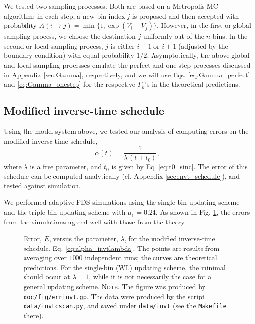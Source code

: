 \documentclass[reprint, superscriptaddress, floatfix]{revtex4-1}
\newcommand{\note}[1]{{\color{DarkGreen}\footnotesize \textsc{Note.} #1}}
\newcommand{\Err}{E}
\begin{document}
We tested two sampling processes.
%
Both are based on
a Metropolis MC algorithm\cite{
  metropolis1953, newman, frenkel,
  landau_binder}:
%
in each step, a new bin index $j$ is proposed
and then accepted with probability
%
$
A(i \to j) = \min\{ 1, \exp(V_i - V_j) \}.
$
However,
in the first or global sampling process,
we choose the destination $j$
uniformly out of the $n$ bins.
%
In the second or local sampling process,
$j$ is either $i - 1$ or $i + 1$
(adjusted by the boundary condition)
with equal probability $1/2$.
%
Asymptotically,
the above global and local sampling processes
emulate the perfect and one-step processes
discussed in Appendix \ref{sec:Gamma},
respectively,
and we will use
Eqs. \eqref{eq:Gamma_perfect}
and \eqref{eq:Gamma_onestep}
for the respective $\Gamma_k$'s
in the theoretical predictions.
%



\subsection{\label{sec:results_invt}
Modified inverse-time schedule}


Using the model system above, we
tested our analysis of computing errors
on the modified inverse-time schedule,
%
\begin{equation}
\alpha(t) = \frac{1}{\lambda \, (t + t_0) },
\label{eq:alpha_invtlambda}
\end{equation}
%
where $\lambda$ is a free parameter,
and $t_0$ is given by Eq. \eqref{eq:t0_sinc}.
%
The error of this schedule
can be computed analytically
(cf. Appendix \ref{sec:invt_schedule}),
and tested against simulation.



We performed adaptive FDS simulations
using the single-bin updating scheme
and the triple-bin updating scheme with $\mu_1 = 0.24$.
%
%
As shown in Fig. \ref{fig:errinvt},
the errors from the simulations
agreed well with those from the theory.


\begin{figure}[h]
\begin{center}
  \caption{
    \label{fig:errinvt}
    Error, $\Err$, versus the parameter, $\lambda$,
    for the modified inverse-time schedule,
    Eq. \eqref{eq:alpha_invtlambda}.
    The points are results from averaging over $1000$ independent runs;
    the curves are theoretical predictions.
    For the single-bin (WL) updating scheme,
    the minimal should occur at $\lambda = 1$,
    while it is not necessarily the case for a general updating scheme.
    \note{The figure was produced by \texttt{doc/fig/errinvt.gp}.
      The data were produced by the script \texttt{data/invtcscan.py},
      and saved under \texttt{data/invt}
      (see the \texttt{Makefile} there).
    }%
  }
\end{center}
\end{figure}
\end{document}
